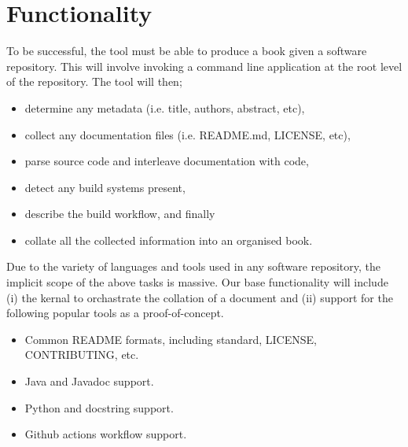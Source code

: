 \documentclass[12pt]{article}
\title{\thetitle}
\author{Brae Webb}
\date{Semester 1, 2022}
\begin{document}
\maketitle

\begin{abstract}
In {\color{red} 1900}, Donald Knuth coined the term \textsl{literate programming}.
Literate programming proposes a paradigm shift wherein programmers are akin to authors,
and programs akin to books.
To successfully make the shift, programs and their documentation must be interleaved.
We propose \textsl{lit}, an \textbf{extensible} tool to transform software repositories into books.
\end{abstract}

\section{Functionality}
To be successful, the tool must be able to produce a book given a software repository.
This will involve invoking a command line application at the root level of the repository.
The tool will then;
\begin{itemize}
    \item determine any metadata (i.e. title, authors, abstract, etc),
    \item collect any documentation files (i.e. README.md, LICENSE, etc),
    \item parse source code and interleave documentation with code,
    \item detect any build systems present,
    \item describe the build workflow, and finally
    \item collate all the collected information into an organised book.
\end{itemize}

Due to the variety of languages and tools used in any software repository,
the implicit scope of the above tasks is massive.
Our base functionality will include (i) the kernal to orchastrate the collation of a document
and (ii) support for the following popular tools as a proof-of-concept.
\begin{itemize}
    \item Common README formats, including {\color{red} standard}, LICENSE, CONTRIBUTING, etc.
    \item Java and Javadoc support.
    \item Python and docstring support.
    \item Github actions workflow support.
\end{itemize}
\end{document}
